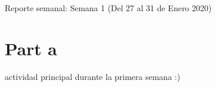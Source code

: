 \documentclass{article}
\begin{document}
Reporte semanal: Semana 1 (Del 27 al 31 de Enero 2020)
\section*{Part a}
    \Como actividad principal durante la primera semana :) 
\end{document}

